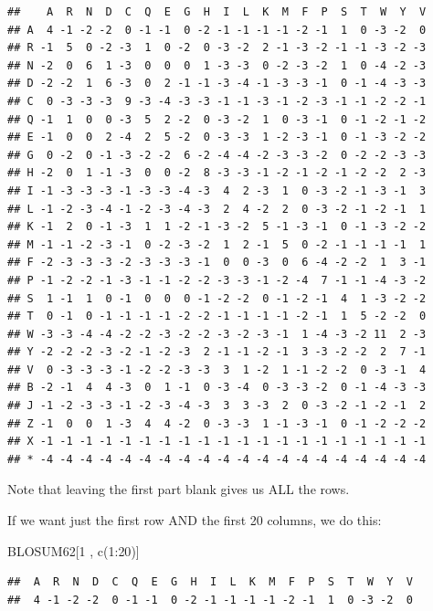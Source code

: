 \documentclass[
]{book}
\newenvironment{Shaded}{\begin{snugshade}}{\end{snugshade}}
\newcommand{\DecValTok}[1]{\textcolor[rgb]{0.00,0.00,0.81}{#1}}
\newcommand{\FunctionTok}[1]{\textcolor[rgb]{0.00,0.00,0.00}{#1}}
\newcommand{\NormalTok}[1]{#1}
\newcommand{\SpecialCharTok}[1]{\textcolor[rgb]{0.00,0.00,0.00}{#1}}
\begin{document}
\begin{verbatim}
##    A  R  N  D  C  Q  E  G  H  I  L  K  M  F  P  S  T  W  Y  V
## A  4 -1 -2 -2  0 -1 -1  0 -2 -1 -1 -1 -1 -2 -1  1  0 -3 -2  0
## R -1  5  0 -2 -3  1  0 -2  0 -3 -2  2 -1 -3 -2 -1 -1 -3 -2 -3
## N -2  0  6  1 -3  0  0  0  1 -3 -3  0 -2 -3 -2  1  0 -4 -2 -3
## D -2 -2  1  6 -3  0  2 -1 -1 -3 -4 -1 -3 -3 -1  0 -1 -4 -3 -3
## C  0 -3 -3 -3  9 -3 -4 -3 -3 -1 -1 -3 -1 -2 -3 -1 -1 -2 -2 -1
## Q -1  1  0  0 -3  5  2 -2  0 -3 -2  1  0 -3 -1  0 -1 -2 -1 -2
## E -1  0  0  2 -4  2  5 -2  0 -3 -3  1 -2 -3 -1  0 -1 -3 -2 -2
## G  0 -2  0 -1 -3 -2 -2  6 -2 -4 -4 -2 -3 -3 -2  0 -2 -2 -3 -3
## H -2  0  1 -1 -3  0  0 -2  8 -3 -3 -1 -2 -1 -2 -1 -2 -2  2 -3
## I -1 -3 -3 -3 -1 -3 -3 -4 -3  4  2 -3  1  0 -3 -2 -1 -3 -1  3
## L -1 -2 -3 -4 -1 -2 -3 -4 -3  2  4 -2  2  0 -3 -2 -1 -2 -1  1
## K -1  2  0 -1 -3  1  1 -2 -1 -3 -2  5 -1 -3 -1  0 -1 -3 -2 -2
## M -1 -1 -2 -3 -1  0 -2 -3 -2  1  2 -1  5  0 -2 -1 -1 -1 -1  1
## F -2 -3 -3 -3 -2 -3 -3 -3 -1  0  0 -3  0  6 -4 -2 -2  1  3 -1
## P -1 -2 -2 -1 -3 -1 -1 -2 -2 -3 -3 -1 -2 -4  7 -1 -1 -4 -3 -2
## S  1 -1  1  0 -1  0  0  0 -1 -2 -2  0 -1 -2 -1  4  1 -3 -2 -2
## T  0 -1  0 -1 -1 -1 -1 -2 -2 -1 -1 -1 -1 -2 -1  1  5 -2 -2  0
## W -3 -3 -4 -4 -2 -2 -3 -2 -2 -3 -2 -3 -1  1 -4 -3 -2 11  2 -3
## Y -2 -2 -2 -3 -2 -1 -2 -3  2 -1 -1 -2 -1  3 -3 -2 -2  2  7 -1
## V  0 -3 -3 -3 -1 -2 -2 -3 -3  3  1 -2  1 -1 -2 -2  0 -3 -1  4
## B -2 -1  4  4 -3  0  1 -1  0 -3 -4  0 -3 -3 -2  0 -1 -4 -3 -3
## J -1 -2 -3 -3 -1 -2 -3 -4 -3  3  3 -3  2  0 -3 -2 -1 -2 -1  2
## Z -1  0  0  1 -3  4  4 -2  0 -3 -3  1 -1 -3 -1  0 -1 -2 -2 -2
## X -1 -1 -1 -1 -1 -1 -1 -1 -1 -1 -1 -1 -1 -1 -1 -1 -1 -1 -1 -1
## * -4 -4 -4 -4 -4 -4 -4 -4 -4 -4 -4 -4 -4 -4 -4 -4 -4 -4 -4 -4
\end{verbatim}

Note that leaving the first part blank gives us ALL the rows.

If we want just the first row AND the first 20 columns, we do this:

\begin{Shaded}
\begin{Highlighting}[]
\NormalTok{BLOSUM62[}\DecValTok{1}\NormalTok{ , }\FunctionTok{c}\NormalTok{(}\DecValTok{1}\SpecialCharTok{:}\DecValTok{20}\NormalTok{)]}
\end{Highlighting}
\end{Shaded}

\begin{verbatim}
##  A  R  N  D  C  Q  E  G  H  I  L  K  M  F  P  S  T  W  Y  V 
##  4 -1 -2 -2  0 -1 -1  0 -2 -1 -1 -1 -1 -2 -1  1  0 -3 -2  0
\end{verbatim}
\end{document}
